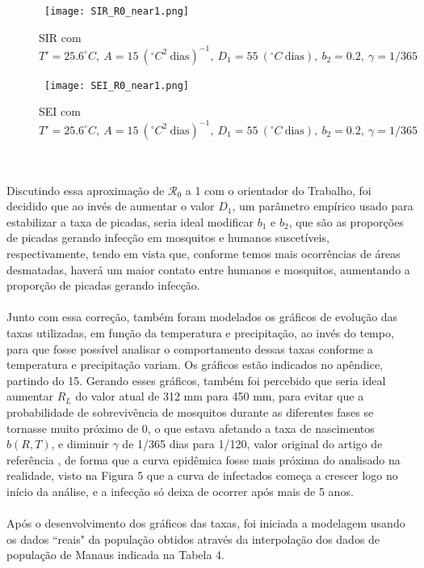 \begin{figure}[!ht]
        \centering
        \hbox{\hspace{3.5em} \texttt{[image: SIR\_R0\_near1.png]}}
        \caption{SIR com $T'=25.6 ^\circ C, \ A=15 \ (^\circ C^2 \ \text{dias})^{-1}, \ D_1=55 \ (^\circ C \ \text{dias}), \ b_2=0.2, \ \gamma=1/365$}
\end{figure} 
\begin{figure}[!ht]
        \centering
        \hbox{\hspace{3.5em} \texttt{[image: SEI\_R0\_near1.png]}}
        \caption{SEI com $T'=25.6 ^\circ C, \ A=15 \ (^\circ C^2 \ \text{dias})^{-1}, \ D_1=55 \ (^\circ C \ \text{dias}), \ b_2=0.2, \ \gamma=1/365$}
\end{figure}
\\\\
Discutindo essa aproximação de $\mathcal{R}_0$ a 1 com o orientador do 
Trabalho, foi decidido 
que ao invés de aumentar o valor $D_1$, um parâmetro empírico usado para 
estabilizar a taxa de picadas, seria ideal modificar $b_1$ e $b_2$, que são as
proporções de picadas gerando infecção em mosquitos e humanos suscetíveis, 
respectivamente, tendo em vista que, conforme temos mais ocorrências de áreas 
desmatadas, haverá um maior contato entre humanos e mosquitos, aumentando a 
proporção de picadas gerando infecção. 
\\\\
Junto com essa correção, também 
foram modelados os gráficos de evolução das taxas utilizadas, em função 
da temperatura e precipitação, ao invés do tempo, para que fosse 
possível analisar o comportamento dessas taxas conforme a temperatura e 
precipitação variam. Os gráficos estão indicados no apêndice, partindo do 15. 
Gerando esses gráficos, também foi percebido que seria ideal aumentar $R_L$ 
do valor atual de 312 mm para 450 mm, para evitar que a probabilidade de 
sobrevivência de mosquitos durante as diferentes fases se 
tornasse muito próximo de 0, o que estava afetando a taxa de 
nascimentos $b(R,T)$, e diminuir $\gamma$ de 1/365 dias para 1/120, valor original
do artigo de referência \cite{Parham2010}, de forma que a curva epidêmica fosse mais
próxima do analisado na realidade, visto na Figura 5 que a curva de infectados começa
a crescer logo no início da análise, e a infecção só deixa de ocorrer após mais de
5 anos.
\\\\
Após o desenvolvimento dos gráficos das taxas, foi iniciada a modelagem usando os dados 
``reais" da população obtidos através da interpolação dos dados de população de Manaus indicada na Tabela 4.

